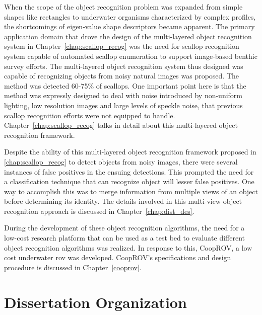 \documentclass {udthesis}
\begin{document}
When the scope of the object recognition problem was expanded from simple shapes like rectangles to underwater organisms characterized by complex profiles,
the shortcomings of eigen-value shape descriptors became apparent. The primary application domain that drove the design of the multi-layered object recognition system in Chapter~\ref{chap:scallop_recog} was the need for 
scallop recognition system capable of automated scallop enumeration to support image-based benthic survey efforts. 
The multi-layered object recognition system thus designed was capable of recognizing objects from noisy natural images was proposed. The method was detected 60-75\% of scallops. One important point here is that the method was expressly designed to deal with noise introduced by non-uniform lighting, low resolution images and large levels of speckle noise, that previous scallop recognition efforts were not equipped to handle. Chapter~\ref{chap:scallop_recog} talks in detail about this multi-layered object recognition framework.

Despite the ability of this multi-layered object recognition framework proposed in \ref{chap:scallop_recog} to detect objects from noisy images, there were 
several instances of false positives in the ensuing detections. This prompted the need for a classification technique that can recognize object will lesser
false positives. One way to accomplish this was to merge information from multiple views of an object before determining its identity. The details involved in this
multi-view object recognition approach is discussed in Chapter~\ref{chap:dist_des}.

During the development of these object recognition algorithms, the need for a low-cost research platform 
that can be used as a test bed to evaluate different object recognition algorithms was realized.
In response to this, CoopROV, a low cost underwater \gls{rov} was developed. CoopROV's specifications and 
design procedure is discussed in Chapter~\ref{cooprov}.

\section{Dissertation Organization}
\end{document}
